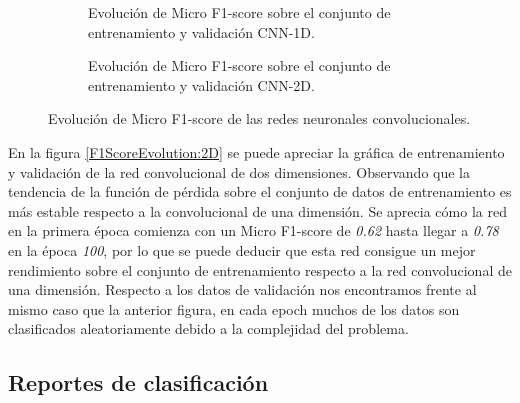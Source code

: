     \begin{figure}[H]
      \centering
      \begin{subfigure}[b]{1\textwidth}
        \centering
        
        \caption{Evolución de Micro F1-score sobre el conjunto de entrenamiento y validación CNN-1D.}
        \label{F1ScoreEvolution:1D}
      \end{subfigure}
      \vspace{1mm}
      \begin{subfigure}[b]{1\textwidth}
        \centering
        
        \caption{Evolución de Micro F1-score sobre el conjunto de entrenamiento y validación CNN-2D.}
        \label{F1ScoreEvolution:2D}
      \end{subfigure}
        \caption{Evolución de Micro F1-score de las redes neuronales convolucionales.}
        \label{F1ScoreEvolution}
     \end{figure}

    En la figura \eqref{F1ScoreEvolution:2D} se puede apreciar la gráfica de entrenamiento y validación de la red convolucional de dos dimensiones. Observando que la tendencia de la función de pérdida sobre el conjunto de datos de entrenamiento es más estable respecto a la convolucional de una dimensión. Se aprecia cómo la red en la primera época comienza con un Micro F1-score de \textit {0.62} hasta llegar a \textit{0.78} en la época \textit{100}, por lo que se puede deducir que esta red consigue un mejor rendimiento sobre el conjunto de entrenamiento respecto a la red convolucional de una dimensión. Respecto a los datos de validación nos encontramos frente al mismo caso que la anterior figura, en cada epoch muchos de los datos son clasificados aleatoriamente debido a la complejidad del problema.

  \subsection{Reportes de clasificación}

